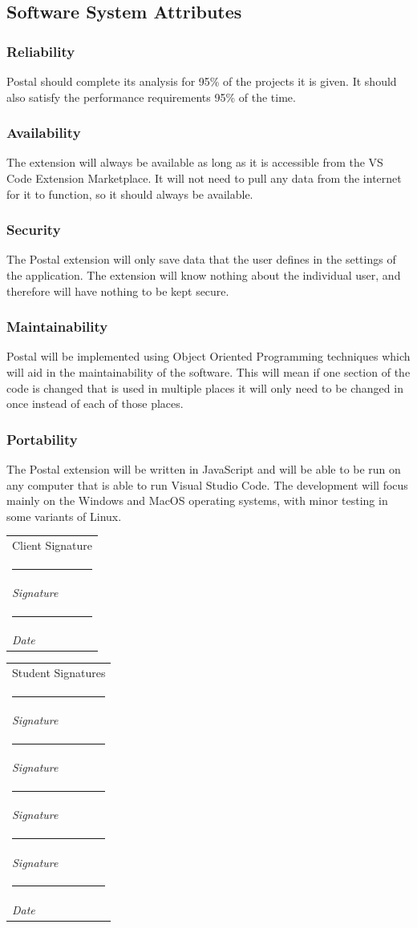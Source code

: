 \documentclass[letterpaper,10pt,titlepage,draftclsnofoot,onecolumn,onesided] {IEEEtran}
\makeatletter
\newcommand{\namesigdate}[2][4cm]{%
  \begin{tabular}{@{}p{#1}@{}}
    #2 \\[2\normalbaselineskip] \hrule \\[0pt]
    {\small \textit{Signature}} \\[2\normalbaselineskip] \hrule \\[0pt]
    {\small \textit{Date}}
  \end{tabular}
}
\newcommand{\studentnamesigdate}[2][4cm]{%
  \begin{tabular}{@{}p{#1}@{}}
    #2 \\[2\normalbaselineskip] \hrule \\[0pt]
    {\small \textit{Signature}} \\[2\normalbaselineskip] \hrule \\[0pt]
    {\small \textit{Signature}} \\[2\normalbaselineskip] \hrule \\[0pt]
    {\small \textit{Signature}} \\[2\normalbaselineskip] \hrule \\[0pt]
    {\small \textit{Signature}} \\[2\normalbaselineskip] \hrule \\[0pt]
    {\small \textit{Date}}
  \end{tabular}
}
\makeatother
\begin{document}
\subsection{Software System Attributes}

\subsubsection{Reliability}
Postal should complete its analysis for 95\% of the projects it is given. It should also satisfy the performance requirements 95\% of the time.   

\subsubsection{Availability}
The extension will always be available as long as it is accessible from the VS Code Extension Marketplace. 
It will not need to pull any data from the internet for it to function, so it should always be available.

\subsubsection{Security}
The Postal extension will only save data that the user defines in the settings of the application. 
The extension will know nothing about the individual user, and therefore will have nothing to be kept secure.

\subsubsection{Maintainability}
Postal will be implemented using Object Oriented Programming techniques which will aid in the maintainability of the software. 
This will mean if one section of the code is changed that is used in multiple places it will only need to be changed in once instead of each of those places.

\subsubsection{Portability}
The Postal extension will be written in JavaScript and will be able to be run on any computer that is able to run Visual Studio Code. 
The development will focus mainly on the Windows and MacOS operating systems, with minor testing in some variants of Linux.


\pagebreak

\namesigdate{Client Signature} \hfill 
\studentnamesigdate[4cm]{Student Signatures}
\end{document}
